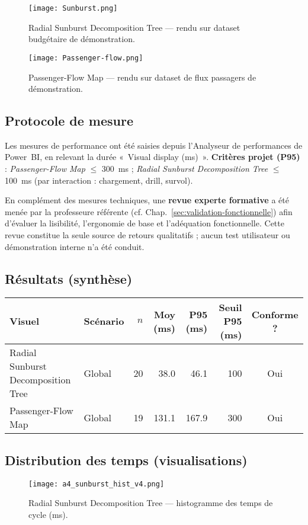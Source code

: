 \begin{figure}[h]
  \centering
  \texttt{[image: Sunburst.png]}
  \caption{Radial Sunburst Decomposition Tree — rendu sur dataset budgétaire de démonstration.}
\end{figure}

\begin{figure}[h]
  \centering
  \texttt{[image: Passenger-flow.png]}
  \caption{Passenger-Flow Map — rendu sur dataset de flux passagers de démonstration.}
\end{figure}

\subsection{Protocole de mesure}
Les mesures de performance ont été saisies depuis l’Analyseur de performances de Power~BI, 
en relevant la durée «~Visual display (ms)~».  
\textbf{Critères projet (P95)} : \textit{Passenger-Flow Map} \(\leq\) 300~ms ; 
\textit{Radial Sunburst Decomposition Tree} \(\leq\) 100~ms (par interaction : chargement, drill, survol).

En complément des mesures techniques, une \textbf{revue experte formative} a été menée par la professeure référente 
(cf. Chap.~\ref{sec:validation-fonctionnelle}) afin d’évaluer la lisibilité, l’ergonomie de base et l’adéquation fonctionnelle.  
Cette revue constitue la seule source de retours qualitatifs ; aucun test utilisateur ou démonstration interne n’a été conduit.

\subsection{Résultats (synthèse)}
\begin{table}[h]
\scriptsize
\setlength{\tabcolsep}{3pt}
\centering
\begin{tabularx}{\linewidth}{l l r r r r c}
\toprule
\textbf{Visuel} & \textbf{Scénario} & \textbf{$n$} & \textbf{Moy (ms)} & \textbf{P95 (ms)} & \textbf{Seuil P95 (ms)} & \textbf{Conforme ?} \\
\midrule
Radial Sunburst Decomposition Tree & Global & 20 & 38.0 & 46.1 & 100 & Oui \\
Passenger-Flow Map & Global & 19 & 131.1 & 167.9 & 300 & Oui \\
\bottomrule
\end{tabularx}
\end{table}

\subsection{Distribution des temps (visualisations)}
\begin{figure}[h]
  \centering
  \texttt{[image: a4\_sunburst\_hist\_v4.png]}
  \caption{Radial Sunburst Decomposition Tree — histogramme des temps de cycle (ms).}
\end{figure}

